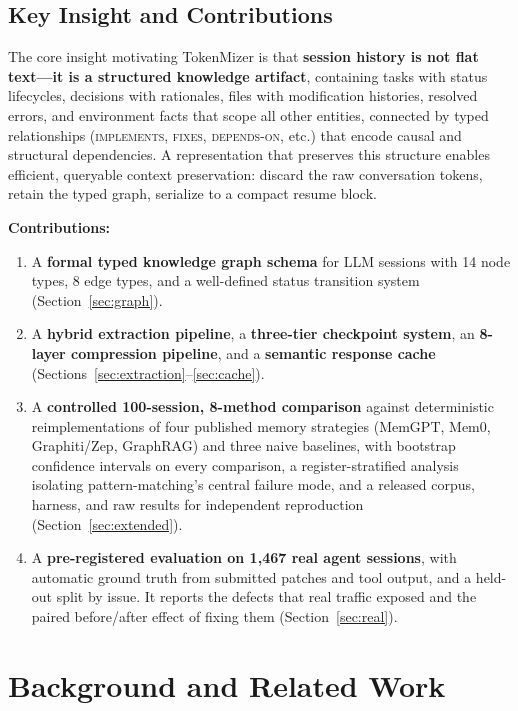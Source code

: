 \documentclass[journal]{IEEEtran}
\begin{document}
\subsection{Key Insight and Contributions}

The core insight motivating TokenMizer is that
\textbf{session history is not flat text---it is a structured
knowledge artifact}, containing tasks with status lifecycles,
decisions with rationales, files with modification histories,
resolved errors, and environment facts that scope all other
entities, connected by typed relationships
(\textsc{implements}, \textsc{fixes}, \textsc{depends-on}, etc.)
that encode causal and structural dependencies.
A representation that preserves this structure enables
efficient, queryable context preservation: discard the raw
conversation tokens, retain the typed graph, serialize to a
compact resume block.

\textbf{Contributions:}
\begin{enumerate}
\item A \textbf{formal typed knowledge graph schema} for LLM
  sessions with 14 node types, 8 edge types, and a well-defined
  status transition system (Section~\ref{sec:graph}).
\item A \textbf{hybrid extraction pipeline}, a
  \textbf{three-tier checkpoint system}, an \textbf{8-layer
  compression pipeline}, and a \textbf{semantic response cache}
  (Sections~\ref{sec:extraction}--\ref{sec:cache}).
\item A \textbf{controlled 100-session, 8-method comparison}
  against deterministic reimplementations of four published
  memory strategies (MemGPT, Mem0, Graphiti/Zep, GraphRAG) and
  three naive baselines, with bootstrap confidence intervals on
  every comparison, a register-stratified analysis isolating
  pattern-matching's central failure mode, and a released
  corpus, harness, and raw results for independent reproduction
  (Section~\ref{sec:extended}).
\item A \textbf{pre-registered evaluation on 1{,}467 real agent
  sessions}, with automatic ground truth from submitted patches
  and tool output, and a held-out split by issue. It reports the
  defects that real traffic exposed and the paired before/after
  effect of fixing them (Section~\ref{sec:real}).
\end{enumerate}

\section{Background and Related Work}
\label{sec:related}
\end{document}

